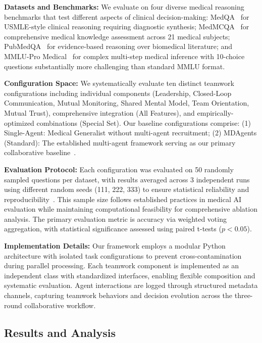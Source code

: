 \documentclass[letterpaper]{article} %
\begin{document}
\textbf{Datasets and Benchmarks:} We evaluate on four diverse medical reasoning benchmarks that test different aspects of clinical decision-making: MedQA~\citep{jin2020disease} for USMLE-style clinical reasoning requiring diagnostic synthesis; MedMCQA~\citep{pal2022medmcqa} for comprehensive medical knowledge assessment across 21 medical subjects; PubMedQA~\citep{jin2019pubmedqa} for evidence-based reasoning over biomedical literature; and MMLU-Pro Medical~\citep{wang2024mmlu} for complex multi-step medical inference with 10-choice questions substantially more challenging than standard MMLU format.

\textbf{Configuration Space:} We systematically evaluate ten distinct teamwork configurations including individual components (Leadership, Closed-Loop Communication, Mutual Monitoring, Shared Mental Model, Team Orientation, Mutual Trust), comprehensive integration (All Features), and empirically-optimized combinations (Special Set). Our baseline configurations comprise: (1) Single-Agent: Medical Generalist without multi-agent recruitment; (2) MDAgents (Standard): The established multi-agent framework serving as our primary collaborative baseline~\citep{kim2024mdagents}.

\textbf{Evaluation Protocol:} Each configuration was evaluated on 50 randomly sampled questions per dataset, with results averaged across 3 independent runs using different random seeds (111, 222, 333) to ensure statistical reliability and reproducibility~\citep{kim2024mdagents}. This sample size follows established practices in medical AI evaluation while maintaining computational feasibility for comprehensive ablation analysis. The primary evaluation metric is accuracy via weighted voting aggregation, with statistical significance assessed using paired t-tests ($p < 0.05$).

\textbf{Implementation Details:} Our framework employs a modular Python architecture with isolated task configurations to prevent cross-contamination during parallel processing. Each teamwork component is implemented as an independent class with standardized interfaces, enabling flexible composition and systematic evaluation. Agent interactions are logged through structured metadata channels, capturing teamwork behaviors and decision evolution across the three-round collaborative workflow.


\subsection{Results and Analysis}
\end{document}
